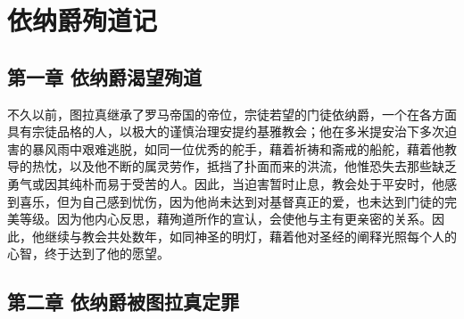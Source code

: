 
\chapter{依纳爵殉道记}



\section{第一章 依纳爵渴望殉道}

不久以前，图拉真继承了罗马帝国的帝位，宗徒若望的门徒依纳爵，一个在各方面具有宗徒品格的人，以极大的谨慎治理安提约基雅教会；他在多米提安治下多次迫害的暴风雨中艰难逃脱，如同一位优秀的舵手，藉着祈祷和斋戒的船舵，藉着他教导的热忱，以及他不断的属灵劳作，抵挡了扑面而来的洪流，他惟恐失去那些缺乏勇气或因其纯朴而易于受苦的人。因此，当迫害暂时止息，教会处于平安时，他感到喜乐，但为自己感到忧伤，因为他尚未达到对基督真正的爱，也未达到门徒的完美等级。因为他内心反思，藉殉道所作的宣认，会使他与主有更亲密的关系。因此，他继续与教会共处数年，如同神圣的明灯，藉着他对圣经的阐释光照每个人的心智，终于达到了他的愿望。\par


\section{第二章 依纳爵被图拉真定罪}

